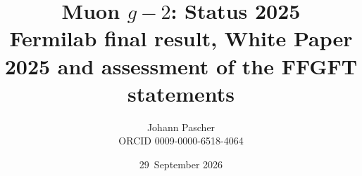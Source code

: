\documentclass[11pt,a4paper]{report}
\title{Muon $g-2$: Status 2025\\[0.5em]
  \large Fermilab final result, White Paper 2025 and assessment of the FFGFT statements}
\date{29~September 2026}
\author{Johann Pascher\\\small ORCID 0009-0000-6518-4064}
\begin{document}
\renewcommand{\thechapter}{}
\renewcommand{\thesection}{\arabic{section}}
\maketitle
\tableofcontents

\end{document}
